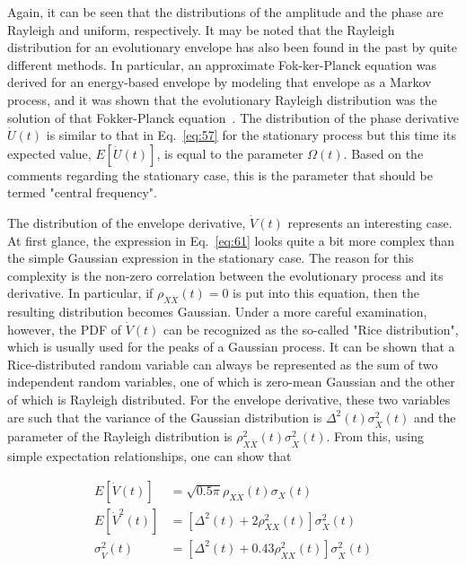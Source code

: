 \documentclass{article}
\begin{document}
Again, it can be seen that the distributions of the amplitude and the phase
are Rayleigh and uniform, respectively. It may be noted that the Rayleigh
distribution for an evolutionary envelope has also been found in the past by
quite different methods. In particular, an approximate Fok-ker-Planck equation
was derived for an energy-based envelope by modeling that envelope as a Markov
process, and it was shown that the evolutionary Rayleigh distribution was the
solution of that Fokker-Planck
equation~{\cite{SpanosLutes1980,SolomosSpanos1982,SpanosSolomos1983}}. The
distribution of the phase derivative $\dot{U} (t)$ is similar to that in
Eq.~\eqref{eq:57} for the stationary process but this time its expected value,
$E [\dot{U} (t)]$, is equal to the parameter $\Omega (t)$. Based on the
comments regarding the stationary case, this is the parameter that should be
termed "central frequency".

The distribution of the envelope derivative, $\dot{V} (t)$ represents an
interesting case. At first glance, the expression in Eq.~\eqref{eq:61} looks
quite a bit more complex than the simple Gaussian expression in the stationary
case. The reason for this complexity is the non-zero correlation between the
evolutionary process and its derivative. In particular, if $\rho_{X \dot{X}}
(t) = 0$ is put into this equation, then the resulting distribution becomes
Gaussian. Under a more careful examination, however, the PDF of $\dot{V} (t)$
can be recognized as the so-called "Rice distribution", which is usually used
for the peaks of a Gaussian process. It can be shown that a Rice-distributed
random variable can always be represented as the sum of two independent random
variables, one of which is zero-mean Gaussian and the other of which is
Rayleigh distributed. For the envelope derivative, these two variables are
such that the variance of the Gaussian distribution is $\Delta^2 (t)
\sigma_{\dot{X}}^2 (t)$ and the parameter of the Rayleigh distribution is
$\rho_{X \dot{X}}^2 (t) \sigma_{\dot{X}}^2 (t)$. From this, using simple
expectation relationships, one can show that

\begin{align}
  E [\dot{V} (t)] & = \sqrt{0.5 \pi} \rho_{X \dot{X}} (t) \sigma_{\dot{X}} (t)
  \nonumber\\
  E [\dot{V}^2 (t)] & = [\Delta^2 (t) + 2 \rho_{X \dot{X}}^2 (t)]
  \sigma_{\dot{X}}^2 (t) \nonumber\\
  \sigma_{\dot{V}}^2 (t) & = [\Delta^2 (t) + 0.43 \rho_{X \dot{X}}^2 (t)]
  \sigma_{\dot{X}}^2 (t)  \label{eq:65}
\end{align}
\end{document}
